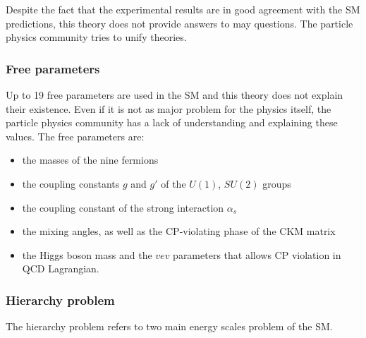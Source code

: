   Despite the fact that the experimental results are in good agreement with the \gls{SM} predictions, this theory does not provide answers to may questions.
  The particle physics community tries to unify theories.

    \subsubsection{Free parameters}

    Up to 19 free parameters are used in the \gls{SM} and this theory does not explain their existence.
    Even if it is not as major problem for the physics itself, the particle physics community has a lack of understanding and explaining these values.
    The free parameters are: 
    \begin{itemize}
      \item the masses of the nine fermions
      \item the coupling constants $g$ and $g'$ of the $U(1)$, $SU(2)$ groups
      \item the coupling constant of the strong interaction $\alpha_s$ 
      \item the mixing angles, as well as the CP-violating phase of the CKM matrix
      \item the Higgs boson mass and the $vev$ parameters that allows CP violation in \gls{QCD} Lagrangian.
    \end{itemize}


  
    \subsubsection{Hierarchy problem}

    The hierarchy problem refers to two main energy scales problem of the \gls{SM}.

